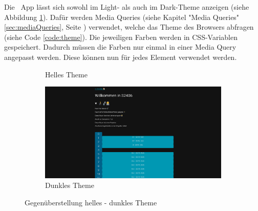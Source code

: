 
Die \ZELIA\ App lässt sich sowohl im Light- als auch im Dark-Theme anzeigen (siehe Abbildung \ref{fig:theme}). 
Dafür werden Media Queries (siehe Kapitel "Media Queries" \ref{sec:mediaQueries}, Seite \pageref{sec:mediaQueries}) verwendet, welche das Theme des Browsers abfragen (siehe Code \ref{code:theme}). 
Die jeweiligen Farben werden in CSS-Variablen gespeichert. 
Dadurch müssen die Farben nur einmal in einer Media Query angepasst werden. Diese können nun für jedes Element verwendet werden. 

\begin{figure}[H]
    \setlength{\fboxsep}{0pt}
    \begin{subfigure}[c]{0.49\textwidth}
        \centering
        \caption{Helles Theme}
    \end{subfigure} \hfill
    \begin{subfigure}[c]{0.49\textwidth}
        \centering
        \includegraphics[width=\textwidth]{media/ResponsiveDesign/ZeliaDesktopDark.png}
        \caption{Dunkles Theme}
    \end{subfigure}
    \caption{Gegenüberstellung helles - dunkles Theme}
    \label{fig:theme}
\end{figure}

